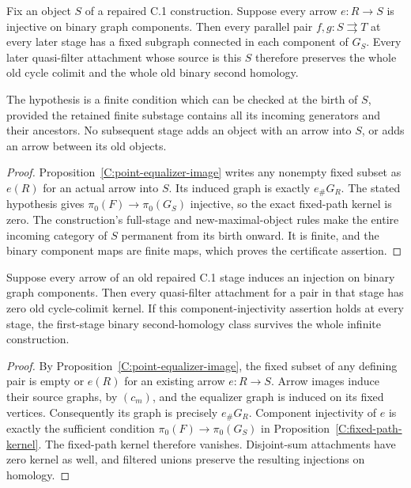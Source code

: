 \begin{corollary}
\label{C:certified-safe-source}
Fix an object $S$ of a repaired C.1 construction.  Suppose every
arrow $e:R\to S$ is injective on binary graph components.  Then
every parallel pair $f,g:S\rightrightarrows T$ at every later
stage has a fixed subgraph connected in each component of $G_S$.
Every later quasi-filter attachment whose source is this $S$
therefore preserves the whole old cycle colimit and the whole
old binary second homology.

The hypothesis is a finite condition which can be checked at the
birth of $S$, provided the retained finite substage contains all
its incoming generators and their ancestors.  No subsequent
stage adds an object with an arrow into $S$, or adds an arrow
between its old objects.
\end{corollary}

\begin{proof}
Proposition~\ref{C:point-equalizer-image} writes any nonempty
fixed subset as $e(R)$ for an actual arrow into $S$.  Its induced
graph is exactly $e_\#G_R$.  The stated hypothesis gives
$\pi_0(F)\to\pi_0(G_S)$ injective, so the exact fixed-path
kernel is zero.  The construction's full-stage and new-maximal-object
rules make the entire incoming category of $S$ permanent from
its birth onward.  It is finite, and the binary component maps
are finite maps, which proves the certificate assertion.
\end{proof}

\begin{corollary}
\label{C:equalizer-component-reduction}
Suppose every arrow of an old repaired C.1 stage induces an
injection on binary graph components.  Then every quasi-filter
attachment for a pair in that stage has zero old cycle-colimit
kernel.  If this component-injectivity assertion holds at every
stage, the first-stage binary second-homology class survives the
whole infinite construction.
\end{corollary}

\begin{proof}
By Proposition~\ref{C:point-equalizer-image}, the fixed subset of
any defining pair is empty or $e(R)$ for an existing arrow
$e:R\to S$.  Arrow images induce their source graphs, by $(c_m)$,
and the equalizer graph is induced on its fixed vertices.
Consequently its graph is precisely $e_\#G_R$.  Component
injectivity of $e$ is exactly the sufficient condition
$\pi_0(F)\to\pi_0(G_S)$ in
Proposition~\ref{C:fixed-path-kernel}.  The fixed-path kernel
therefore vanishes.  Disjoint-sum attachments have zero kernel
as well, and filtered unions preserve the resulting injections
on homology.
\end{proof}

